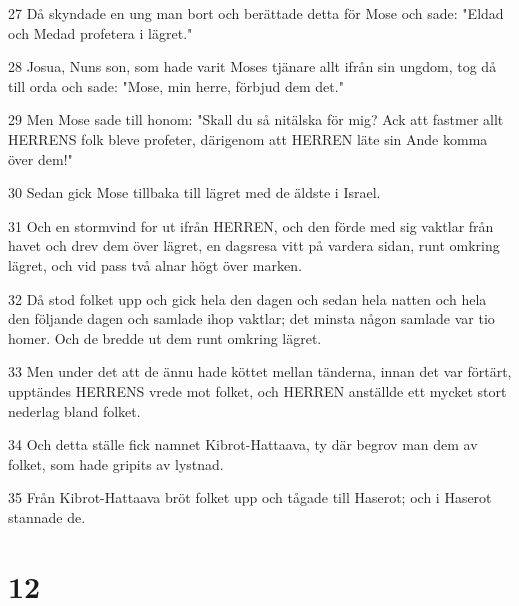 \par 27 Då skyndade en ung man bort och berättade detta för Mose och sade: "Eldad och Medad profetera i lägret."
\par 28 Josua, Nuns son, som hade varit Moses tjänare allt ifrån sin ungdom, tog då till orda och sade: "Mose, min herre, förbjud dem det."
\par 29 Men Mose sade till honom: "Skall du så nitälska för mig? Ack att fastmer allt HERRENS folk bleve profeter, därigenom att HERREN läte sin Ande komma över dem!"
\par 30 Sedan gick Mose tillbaka till lägret med de äldste i Israel.
\par 31 Och en stormvind for ut ifrån HERREN, och den förde med sig vaktlar från havet och drev dem över lägret, en dagsresa vitt på vardera sidan, runt omkring lägret, och vid pass två alnar högt över marken.
\par 32 Då stod folket upp och gick hela den dagen och sedan hela natten och hela den följande dagen och samlade ihop vaktlar; det minsta någon samlade var tio homer. Och de bredde ut dem runt omkring lägret.
\par 33 Men under det att de ännu hade köttet mellan tänderna, innan det var förtärt, upptändes HERRENS vrede mot folket, och HERREN anställde ett mycket stort nederlag bland folket.
\par 34 Och detta ställe fick namnet Kibrot-Hattaava, ty där begrov man dem av folket, som hade gripits av lystnad.
\par 35 Från Kibrot-Hattaava bröt folket upp och tågade till Haserot; och i Haserot stannade de.

\chapter{12}

